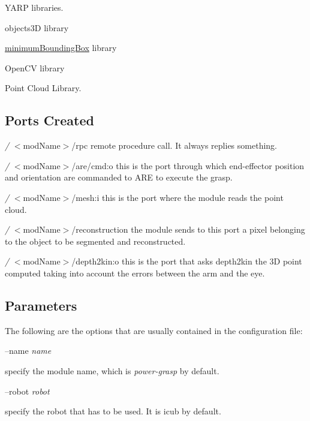 \begin{DoxyItemize}
\item Y\+A\+R\+P libraries.
\item objects3\+D library
\item \hyperlink{group__minimumBoundingBox}{minimum\+Bounding\+Box} library
\item Open\+C\+V library
\item Point Cloud Library.
\end{DoxyItemize}\hypertarget{group__handIKModule_portsc_sec}{}\subsection{Ports Created}\label{group__handIKModule_portsc_sec}

\begin{DoxyItemize}
\item {\itshape /} $<$mod\+Name$>$/rpc remote procedure call. It always replies something.
\item {\itshape /} $<$mod\+Name$>$/are/cmd\+:o this is the port through which end-\/effector position and orientation are commanded to A\+R\+E to execute the grasp.
\item {\itshape /} $<$mod\+Name$>$/mesh\+:i this is the port where the module reads the point cloud.
\item {\itshape /} $<$mod\+Name$>$/reconstruction the module sends to this port a pixel belonging to the object to be segmented and reconstructed.
\item {\itshape /} $<$mod\+Name$>$/depth2kin\+:o this is the port that asks depth2kin the 3\+D point computed taking into account the errors between the arm and the eye.
\end{DoxyItemize}\hypertarget{group__handIKModule_parameters_sec}{}\subsection{Parameters}\label{group__handIKModule_parameters_sec}
The following are the options that are usually contained in the configuration file\+:

--name {\itshape name} 
\begin{DoxyItemize}
\item specify the module name, which is {\itshape power-\/grasp} by default.
\end{DoxyItemize}

--robot {\itshape robot} 
\begin{DoxyItemize}
\item specify the robot that has to be used. It is icub by default.
\end{DoxyItemize}

